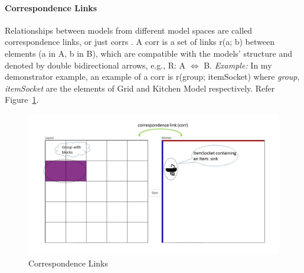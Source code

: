 \paragraph{Correspondence Links} Relationships between models from different model spaces are called correspondence links, or just corrs \cite{benchmarx-reload}. A corr is a set of links 
r(a; b) between elements (a in A, b in B), which are compatible with the models' structure and denoted by double bidirectional arrows, e.g., R: A $\Longleftrightarrow$ B. 
\newline\newline\textit{Example:} In my demonstrator example, an example of a corr is r(group; itemSocket) where \textit{group}, \textit{itemSocket} are the elements of Grid and Kitchen Model respectively. Refer Figure~\ref{fig:Corr}.
\begin{figure}
	\includegraphics[width=1\textwidth]{figures/Corr}
	\caption{Correspondence Links}
	\label{fig:Corr}
\end{figure}

